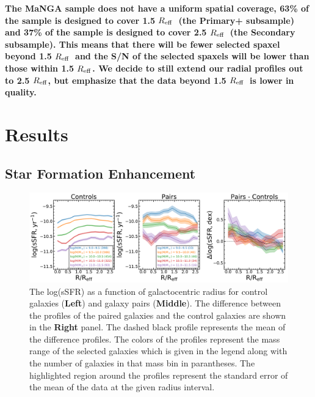 \documentclass[iop,revtex4,twocolumn,apj,numberedappendix,appendixfloats]{emulateapj}
\newcommand{\reff}{$R_{\rm eff}$}
\begin{document}
\textbf{The MaNGA sample does not have a uniform spatial coverage, 63\% of the sample is designed to cover 1.5 \reff\ (the Primary+ subsample) and 37\% of the sample is designed to cover 2.5 \reff\ (the Secondary subsample). This means that there will be fewer selected spaxel beyond 1.5 \reff\ and the S/N of the selected spaxels will be lower than those within 1.5 \reff. We decide to still extend our radial profiles out to 2.5 \reff, but emphasize that the data beyond 1.5 \reff\ is lower in quality. } 


\section{Results}\label{sec:results}

\subsection{Star Formation Enhancement}

\begin{figure}
\centering
\includegraphics[width=\linewidth]{fig/ssfr_comb.pdf}
\caption[]{The log(sSFR) as a function of galactocentric radius for control galaxies (\textbf{Left}) and galaxy pairs (\textbf{Middle}). The difference between the profiles of the paired galaxies and the control galaxies are shown in the \textbf{Right} panel. The dashed black profile represents the mean of the difference profiles. The colors of the profiles represent the mass range of the selected galaxies which is given in the legend along with the number of galaxies in that mass bin in parantheses. The highlighted region around the profiles represent the standard error of the mean of the data at the given radius interval. }
\label{fig:ssfr_prof}
\end{figure}
\end{document}
